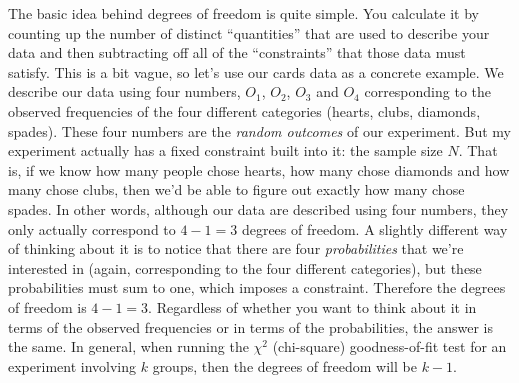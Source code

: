The basic idea behind degrees of freedom is quite simple. You calculate it by counting up the number of distinct ``quantities'' that are used to describe your data and then subtracting off all of the ``constraints'' that those data must satisfy. This is a bit vague, so let's use our cards data as a concrete example. We describe our data using four numbers, $O_1$, $O_2$, $O_3$ and $O_4$ corresponding to the observed frequencies of the four different categories (hearts, clubs, diamonds, spades). These four numbers are the {\it random outcomes} of our experiment. But my experiment actually has a fixed constraint built into it: the sample size $N$. That is, if we know how many people chose hearts, how many chose diamonds and how many chose clubs, then we'd be able to figure out exactly how many chose spades. In other words, although our data are described using four numbers, they only actually correspond to $4-1 = 3$ degrees of freedom. A slightly different way of thinking about it is to notice that there are four {\it probabilities} that we're interested in (again, corresponding to the four different categories), but these probabilities must sum to one, which imposes a constraint. Therefore the degrees of freedom is $4-1 = 3$. Regardless of whether you want to think about it in terms of the observed frequencies or in terms of the probabilities, the answer is the same. In general, when running the $\chi^2$ (chi-square) goodness-of-fit test for an experiment involving $k$ groups, then the degrees of freedom will be $k-1$.

